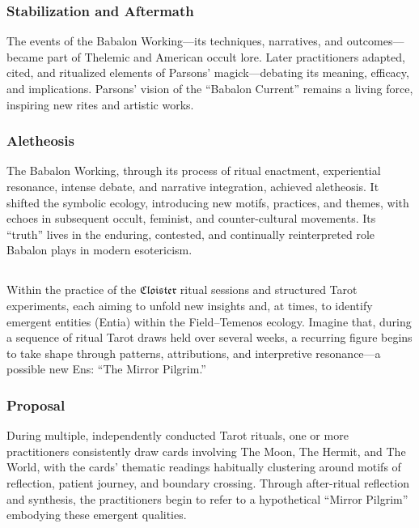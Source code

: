 \subsubsection*{Stabilization and Aftermath}

The events of the Babalon Working—its techniques, narratives, and
outcomes—became part of Thelemic and American occult lore. Later practitioners
adapted, cited, and ritualized elements of Parsons’ magick—debating its
meaning, efficacy, and implications. Parsons’ vision of the “Babalon Current”
remains a living force, inspiring new rites and artistic works.

\subsubsection*{Aletheosis}

The Babalon Working, through its process of ritual enactment, experiential
resonance, intense debate, and narrative integration, achieved aletheosis. It
shifted the symbolic ecology, introducing new motifs, practices, and themes,
with echoes in subsequent occult, feminist, and counter-cultural movements. Its
“truth” lives in the enduring, contested, and continually reinterpreted role
Babalon plays in modern esotericism.


\subsection*{}

Within the practice of the $\mathfrak{Cloister}$ ritual sessions and structured
Tarot experiments, each aiming to unfold new insights and, at times, to
identify emergent entities (Entia) within the Field–Temenos ecology. Imagine
that, during a sequence of ritual Tarot draws held over several weeks, a
recurring figure begins to take shape through patterns, attributions, and
interpretive resonance—a possible new Ens: “The Mirror Pilgrim.”

\subsubsection{Proposal}

During multiple, independently conducted Tarot rituals, one or more
practitioners consistently draw cards involving The Moon, The Hermit, and The
World, with the cards’ thematic readings habitually clustering around motifs of
reflection, patient journey, and boundary crossing. Through after-ritual
reflection and synthesis, the practitioners begin to refer to a hypothetical
“Mirror Pilgrim” embodying these emergent qualities.

